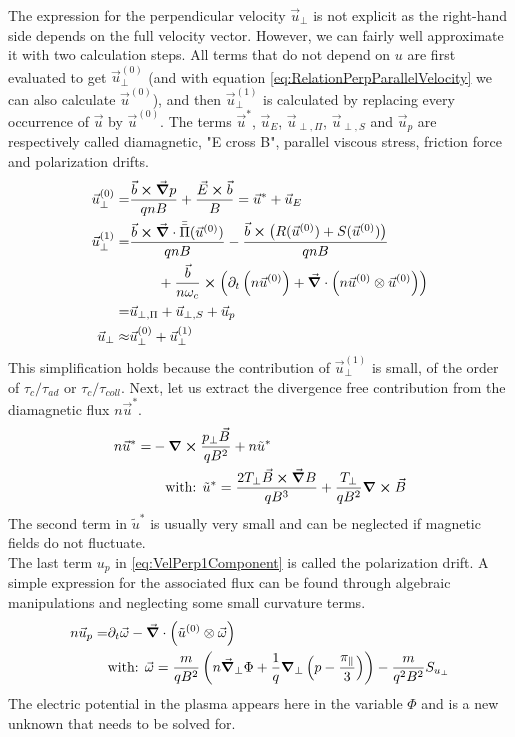 The expression for the perpendicular velocity $\vec{u}_\perp$ is not explicit as the right-hand side depends on the full velocity vector. However, we can fairly well approximate it with two calculation steps. All terms that do not depend on $u$ are first evaluated to get $\vec{u}_\perp^{(0)}$ (and with equation \ref{eq:RelationPerpParallelVelocity} we can also calculate $\vec{u}^{(0)}$), and then $\vec{u}_\perp^{(1)}$ is calculated by replacing every occurrence of $\vec{u}$ by $\vec{u}^{(0)}$. The terms $\vec{u}^*$, $\vec{u}_E$, $\vec{u}_{\perp,\Pi}$, $\vec{u}_{\perp,S}$ and $\vec{u}_{p}$ are respectively called diamagnetic, "E cross B", parallel viscous stress, friction force and polarization drifts.
\begin{align}
	\vec{u}_\perp^{(0)} =& \frac{\vec{b}\cross\vec{\grad} p}{qnB} + \frac{\vec{E}\cross\vec{b}}{B} = \vec{u}^* + \vec{u}_E \label{eq:VelPerp0Component} \\	
	\vec{u}_\perp^{(1)} =& \frac{\vec{b}\cross\vec{\grad}\cdot\bar{\bar{\Pi}}(\vec{u}^{(0)})}{qnB} - \frac{\vec{b}\cross\left(R(\vec{u}^{(0)})+S(\vec{u}^{(0)})\right)}{qnB} \nonumber\\ & \qquad + \frac{\vec{b}}{n\omega_c} \cross \left(\partial_t \left(n\vec{u}^{(0)}\right) + \vec{\grad}\cdot\left(n\vec{u}^{(0)}\otimes\vec{u}^{(0)}\right)\right) \nonumber \\
	=& \vec{u}_{\perp,\Pi} + \vec{u}_{\perp,S} + \vec{u}_{p} \label{eq:VelPerp1Component} \\
	\vec{u}_\perp \approx& \vec{u}_\perp^{(0)} + \vec{u}_\perp^{(1)}
\end{align}
This simplification holds because the contribution of $\vec{u}_\perp^{(1)}$ is small, of the order of $\tau_c / \tau_{ad}$ or $\tau_c / \tau_{coll}$. Next, let us extract the divergence free contribution from the diamagnetic flux $n\vec{u}^*$.
\begin{align}
	\label{eq:definitionDiamagneticDrift}
	n\vec{u}^* =& -\grad \cross \frac{p_\perp\vec{B}}{qB^2} + n\tilde{u}^* \nonumber\\
	& \quad\text{with: } \tilde{u}^* = \frac{2T_\perp\vec{B}\cross\vec{\grad} B}{qB^3} + \frac{T_\perp}{qB^2}\grad\cross\vec{B}
\end{align}
The second term in $\tilde{u}^*$ is usually very small and can be neglected if magnetic fields do not fluctuate. \\
The last term $u_{p}$ in \autoref{eq:VelPerp1Component} is called the polarization drift. A simple expression for the associated flux can be found through algebraic manipulations and neglecting some small curvature terms.
\begin{align}
	n\vec{u}_{p} =& \partial_t\vec{\omega} - \vec{\grad}\cdot\left(\tilde{u}^{(0)}\otimes\vec{\omega}\right) \nonumber \\
	&\text{with: } \vec{\omega} = \frac{m}{qB^2}\left(n\vec{\grad}_\perp\Phi + \frac{1}{q}\grad_{\perp}\left(p-\frac{\pi_\parallel}{3}\right)\right) - \frac{m}{q^2B^2}S_{u_\perp} \label{eq:definitionSmallOmega}
\end{align}
The electric potential in the plasma appears here in the variable $\Phi$ and is a new unknown that needs to be solved for.

